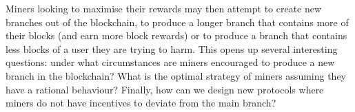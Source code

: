 %
Miners looking to maximise their rewards may then attempt to create new branches out of the blockchain, to produce a longer branch that contains more of their blocks (and earn more block rewards) or to produce a branch that contains less blocks of a user they are trying to harm. This opens up several interesting questions: under what circumstances are miners 
encouraged to produce a new branch in the blockchain? What is the optimal strategy of miners assuming they have a rational behaviour? %
Finally, how can we design new protocols where miners do not have incentives to deviate from the main branch? 



